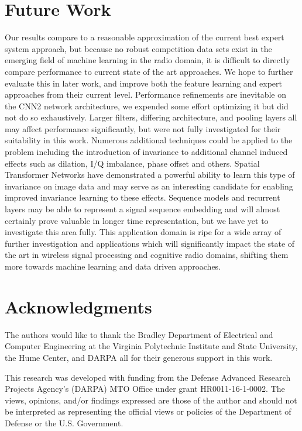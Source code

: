 \documentclass[runningheads,a4paper]{llncs}
\begin{document}
\section{Future Work}

Our results compare to a reasonable approximation of the current best expert system approach, but because no robust competition data sets exist in the emerging field of machine learning in the radio domain, it is difficult to directly compare performance to current state of the art approaches.   We hope to further evaluate this in later work, and improve both the feature learning and expert approaches from their current level.
Performance refinements are inevitable on the CNN2 network architecture, we expended some effort optimizing it but did not do so exhaustively.  Larger filters, differing architecture, and pooling layers all may affect performance significantly, but were not fully investigated for their suitability in this work.
Numerous additional techniques could be applied to the problem including the introduction of invariance to additional channel induced effects such as dilation, I/Q imbalance, phase offset and others.  Spatial Transformer Networks \cite{stn} have demonstrated a powerful ability to learn this type of invariance on image data and may serve as an interesting candidate for enabling improved invariance learning to these effects.
Sequence models and recurrent layers \cite{speechseq} may be able to represent a signal sequence embedding and will almost certainly prove valuable in longer time representation, but we have yet to investigate this area fully.
This application domain is ripe for a wide array of further investigation and applications which will significantly impact the state of the art in wireless signal processing and cognitive radio domains, shifting them more towards machine learning and data driven approaches.

\section*{Acknowledgments}

The authors would like to thank the Bradley Department of Electrical and Computer Engineering at the Virginia Polytechnic Institute and State University, the Hume Center, and DARPA all for their generous support in this work.

This research was developed with funding from the Defense Advanced Research Projects Agency's (DARPA) MTO Office under grant HR0011-16-1-0002. The views, opinions, and/or findings expressed are those of the author and should not be interpreted as representing the official views or policies of the Department of Defense or the U.S. Government.
 
 
\printbibliography
\end{document}
